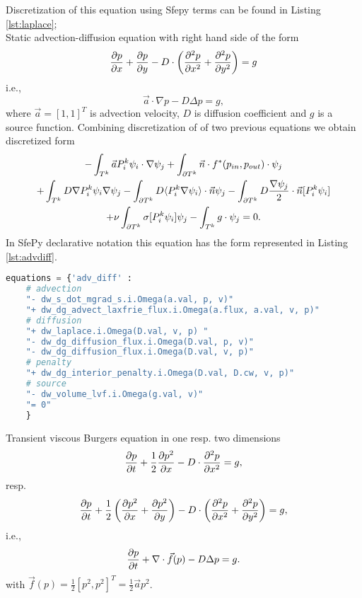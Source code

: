 Discretization of this equation using Sfepy terms can be found in Listing 
\ref{lst:laplace};\\
Static advection-diffusion equation with right hand side of the form
\begin{equation}
\label{eq:ex_advdiff}
\frac{\partial p}{\partial x} + \frac{\partial p}{\partial y} - D \cdot \left( \frac{\partial^2 p}{\partial x^2} + \frac{\partial^2 
p}{\partial y^2} \right) = g
\end{equation}
i.e.,
\begin{equation}
\vec{a} \cdot \nabla p - D \Delta p = g,
\end{equation}
where $\vec{a} = [1, 1]^T$ is advection velocity, $D$ is diffusion coefficient and $g$ is 
a source function. Combining discretization of of two previous equations we obtain 
discretized form
\begin{multline}
- \int_{T^k} \vec{a}P_i^k\psi_i\cdot\nabla\psi_j 
+ \int_{\partial{T^k}} \vec{n}\cdot f^{*} (p_{in}, p_{out})\cdot\psi_j\\
+ \int_{T^k} D\nabla P^k_i\psi_i \nabla \psi_j
- \int_{\partial T^k} D \langle P^k_i\nabla\psi_i\rangle \cdot \vec{n}\psi_j
- \int_{\partial T^k} D \frac{\nabla \psi_j}{2}\cdot \vec{n} [P^k_i\psi_i] \\
+ \nu \int_{\partial T^k} \sigma [P^k_i\psi_i]\psi_j
- \int_{T^k} g\cdot \psi_j
= 0.
\end{multline}
In SfePy declarative notation this equation has the form represented in 
Listing \ref{lst:advdiff}.
\setcounter{lstannotation}{0}
\begin{lstlisting}[language=Python, caption=Static advection-diffusion equation
\label{lst:advdiff}]
equations = {'adv_diff' :
	# advection
	"- dw_s_dot_mgrad_s.i.Omega(a.val, p, v)"
	"+ dw_dg_advect_laxfrie_flux.i.Omega(a.flux, a.val, v, p)"
	# diffusion
	"+ dw_laplace.i.Omega(D.val, v, p) "
	"- dw_dg_diffusion_flux.i.Omega(D.val, p, v)"
	"- dw_dg_diffusion_flux.i.Omega(D.val, v, p)"
	# penalty
	"+ dw_dg_interior_penalty.i.Omega(D.val, D.cw, v, p)"
	# source
	"- dw_volume_lvf.i.Omega(g.val, v)"
	"= 0"
	}
\end{lstlisting}
Transient viscous Burgers equation in one resp. two dimensions
\begin{equation}
\frac{\partial p}{\partial t} + \frac{1}{2}\frac{\partial p^2}{\partial x} - D \cdot\frac{\partial^2 p}{\partial x^2} = g,
\end{equation}
resp.
\begin{equation}
\label{eq:ex_burgers}
	\frac{\partial p}{\partial t} + \frac{1}{2}\left(\frac{\partial p^2}{\partial x} + \frac{\partial p^2}{\partial y}\right)  - 
	D \cdot \left( \frac{\partial^2 p}{\partial x^2} + \frac{\partial^2 p}{\partial y^2} \right) 
	= g,
\end{equation}
i.e.,
\begin{equation}
	\frac{\partial p}{\partial t} + \nabla \cdot \vec{f}(p) - D\Delta p = g.
\end{equation}
with $\vec{f}(p) = \frac{1}{2}[p^2, p^2]^T = \frac{1}{2}\vec{a} p^2$.


